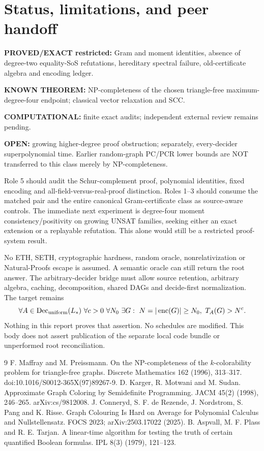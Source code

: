 \documentclass[11pt]{article}
\begin{document}
\section{Status, limitations, and peer handoff}
\noindent\textbf{PROVED/EXACT restricted:} Gram and moment identities, absence of degree-two equality-SoS refutations, hereditary spectral failure, old-certificate algebra and encoding ledger.\par
\noindent\textbf{KNOWN THEOREM:} NP-completeness of the chosen triangle-free maximum-degree-four endpoint; classical vector relaxation and SCC.\par
\noindent\textbf{COMPUTATIONAL:} finite exact audits; independent external review remains pending.\par
\noindent\textbf{OPEN:} growing higher-degree proof obstruction; separately, every-decider superpolynomial time. Earlier random-graph PC/PCR lower bounds are NOT transferred to this class merely by NP-completeness.

Role 5 should audit the Schur-complement proof, polynomial identities, fixed encoding and all-field-versus-real-proof distinction. Roles 1--3 should consume the matched pair and the entire canonical Gram-certificate class as source-aware controls. The immediate next experiment is degree-four moment consistency/positivity on growing UNSAT families, seeking either an exact extension or a replayable refutation. This alone would still be a restricted proof-system result.

No ETH, SETH, cryptographic hardness, random oracle, nonrelativization or Natural-Proofs escape is assumed. A semantic oracle can still return the root answer. The arbitrary-decider bridge must allow source retention, arbitrary algebra, caching, decomposition, shared DAGs and decide-first normalization. The target remains
\[
\forall A\in\operatorname{Dec}_{\rm uniform}(L_*)\ \forall c>0\ \forall N_0\
\exists G:\ N=|\operatorname{enc}(G)|\ge N_0,\ T_A(G)>N^c.
\]
Nothing in this report proves that assertion. No schedules are modified. This body does not assert publication of the separate local code bundle or unperformed root reconciliation.

\begin{thebibliography}{9}
 F. Maffray and M. Preissmann. On the NP-completeness of the $k$-colorability problem for triangle-free graphs. Discrete Mathematics 162 (1996), 313--317. doi:10.1016/S0012-365X(97)89267-9.
\bibitem{KMS} D. Karger, R. Motwani and M. Sudan. Approximate Graph Coloring by Semidefinite Programming. JACM 45(2) (1998), 246--265. arXiv:cs/9812008.
\bibitem{PC} J. Conneryd, S. F. de Rezende, J. Nordstrom, S. Pang and K. Risse. Graph Colouring Is Hard on Average for Polynomial Calculus and Nullstellensatz. FOCS 2023; arXiv:2503.17022 (2025).
\bibitem{APT} B. Aspvall, M. F. Plass and R. E. Tarjan. A linear-time algorithm for testing the truth of certain quantified Boolean formulas. IPL 8(3) (1979), 121--123.
\end{thebibliography}
\end{document}
